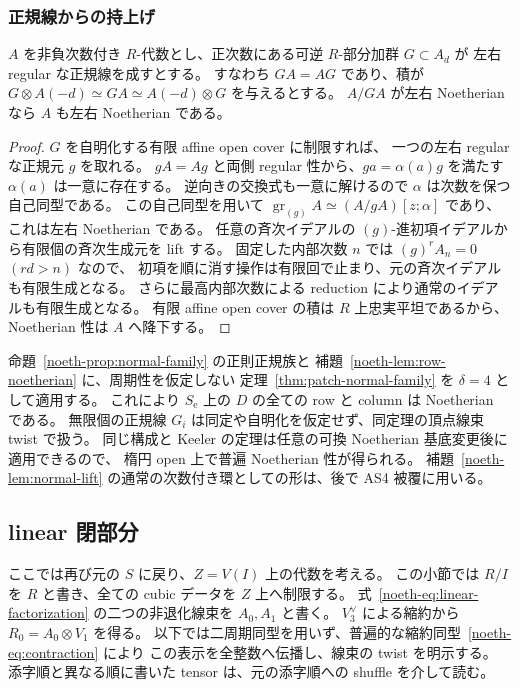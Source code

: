 \subsubsection{正規線からの持上げ}

\begin{lemma}\label{noeth-lem:normal-lift}
$A$ を非負次数付き $R$-代数とし、正次数にある可逆 $R$-部分加群 $G\subset A_d$ が
左右 regular な正規線を成すとする。
すなわち $GA=AG$ であり、積が
$G\otimes A(-d)\simeq GA\simeq A(-d)\otimes G$ を与えるとする。
$A/GA$ が左右 Noetherian なら $A$ も左右 Noetherian である。
\end{lemma}

\begin{proof}
$G$ を自明化する有限 affine open cover に制限すれば、
一つの左右 regular な正規元 $g$ を取れる。
$gA=Ag$ と両側 regular 性から、$ga=\alpha(a)g$ を満たす $\alpha(a)$ は一意に存在する。
逆向きの交換式も一意に解けるので $\alpha$ は次数を保つ自己同型である。
この自己同型を用いて
$\operatorname{gr}_{(g)}A\simeq(A/gA)[z;\alpha]$ であり、これは左右 Noetherian である。
任意の斉次イデアルの $(g)$-進初項イデアルから有限個の斉次生成元を lift する。
固定した内部次数 $n$ では $(g)^rA_n=0$ $(rd>n)$ なので、
初項を順に消す操作は有限回で止まり、元の斉次イデアルも有限生成となる。
さらに最高内部次数による reduction により通常のイデアルも有限生成となる。
有限 affine open cover の積は $R$ 上忠実平坦であるから、Noetherian 性は $A$ へ降下する。
\end{proof}

命題~\ref{noeth-prop:normal-family} の正則正規族と
補題~\ref{noeth-lem:row-noetherian} に、周期性を仮定しない
定理~\ref{thm:patch-normal-family} を $\delta=4$ として適用する。
これにより $S_{\mathrm e}$ 上の $D$ の全ての row と column は Noetherian である。
無限個の正規線 $G_i$ は同定や自明化を仮定せず、同定理の頂点線束 twist で扱う。
同じ構成と Keeler の定理は任意の可換 Noetherian 基底変更後に適用できるので、
楕円 open 上で普遍 Noetherian 性が得られる。
補題~\ref{noeth-lem:normal-lift} の通常の次数付き環としての形は、後で AS4 被覆に用いる。

\subsection{linear 閉部分}

ここでは再び元の $S$ に戻り、$Z=V(I)$ 上の代数を考える。
この小節では $R/I$ を $R$ と書き、全ての cubic データを $Z$ 上へ制限する。
式~\eqref{noeth-eq:linear-factorization} の二つの非退化線束を $A_0,A_1$ と書く。
$V_3^\vee$ による縮約から $R_0=A_0\otimes V_1$ を得る。
以下では二周期同型を用いず、普遍的な縮約同型~\eqref{noeth-eq:contraction} により
この表示を全整数へ伝播し、線束の twist を明示する。
添字順と異なる順に書いた tensor は、元の添字順への shuffle を介して読む。

